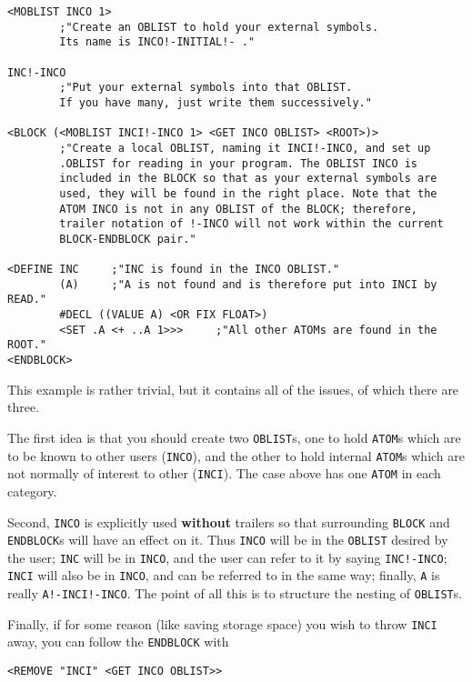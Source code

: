 \documentclass[a4paper,]{article}
\begin{document}
\begin{verbatim}
<MOBLIST INCO 1>
        ;"Create an OBLIST to hold your external symbols.
        Its name is INCO!-INITIAL!- ."

INC!-INCO
        ;"Put your external symbols into that OBLIST.
        If you have many, just write them successively."

<BLOCK (<MOBLIST INCI!-INCO 1> <GET INCO OBLIST> <ROOT>)>
        ;"Create a local OBLIST, naming it INCI!-INCO, and set up
        .OBLIST for reading in your program. The OBLIST INCO is
        included in the BLOCK so that as your external symbols are
        used, they will be found in the right place. Note that the
        ATOM INCO is not in any OBLIST of the BLOCK; therefore,
        trailer notation of !-INCO will not work within the current
        BLOCK-ENDBLOCK pair."

<DEFINE INC     ;"INC is found in the INCO OBLIST."
        (A)     ;"A is not found and is therefore put into INCI by READ."
        #DECL ((VALUE A) <OR FIX FLOAT>)
        <SET .A <+ ..A 1>>>     ;"All other ATOMs are found in the ROOT."
<ENDBLOCK>
\end{verbatim}

This example is rather trivial, but it contains all of the issues, of which there are three.

The first idea is that you should create two \texttt{OBLIST}s, one to hold \texttt{ATOM}s which are to be known to other
users (\texttt{INCO}), and the other to hold internal \texttt{ATOM}s which are not normally of interest to other
(\texttt{INCI}). The case above has one \texttt{ATOM} in each category.

Second, \texttt{INCO} is explicitly used \textbf{without} trailers so that surrounding \texttt{BLOCK} and
\texttt{ENDBLOCK}s will have an effect on it. Thus \texttt{INCO} will be in the \texttt{OBLIST} desired by the user;
\texttt{INC} will be in \texttt{INCO}, and the user can refer to it by saying \texttt{INC!-INCO}; \texttt{INCI} will also
be in \texttt{INCO}, and can be referred to in the same way; finally, \texttt{A} is really \texttt{A!-INCI!-INCO}. The
point of all this is to structure the nesting of \texttt{OBLIST}s.

Finally, if for some reason (like saving storage space) you wish to throw \texttt{INCI} away, you can follow the
\texttt{ENDBLOCK} with

\begin{verbatim}
<REMOVE "INCI" <GET INCO OBLIST>>
\end{verbatim}
\end{document}
